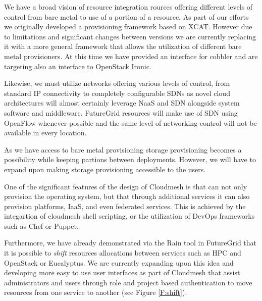 \documentclass{tex/sig-alternate-2013}
\begin{document}
\begin{description}[leftmargin=0pt,itemsep=0pt,topsep=0pt]

\item[Compute Provisioning.] We have a broad vision of resource
  integration rources offering different levels of control from bare
  metal to use of a portion of a resource. As part of our efforts we
  originally developed a provisioning framework based on XCAT. However
  due to limitations and significant changes between versions we are
  currently replacing it with a more general framework that allows the
  utilization of different bare metal provisioners. At this time we
  have provided an interface for cobbler and are targeting also an
  interface to OpenStack Ironic.

\item[Network Provisioning.] Likewise, we must utilize networks
offering various levels of control, from standard IP connectivity to
completely configurable SDNs as novel cloud architectures will almost
certainly leverage NaaS and SDN alongside system software and
middleware. FutureGrid resources will make use of SDN using OpenFlow
whenever possible and the same level of networking control will not be
available in every location.

\item[Storage Provisioning.] As we have access to bare metal
  provisioning storage provisioning becomes a possibility while
  keeping partions between deployments. However, we will have to
  expand upon making storage provisioning accessible to the users.

\item[Platform, IaaS, and Federated Provisioning.] One of the
  significant features of the design of Cloudmesh is that can not only
  provision the operating system, but that through additional services
  it can also provision platforms, IaaS, and even federated
  services. This is achieved by the integartion of cloudmesh shell
  scripting, or the utilization of DevOps frameworks such as Chef or Puppet. 

  Furthermore, we have already demonstrated via the Rain tool in
  FutureGrid that it is possible to {\em shift} resources
  allocations between services such as HPC and OpenStack or
  Eucalyptus. We are currently expanding upon this idea and developing
  more easy to use user interfaces as part of Cloudmesh that assist
  administrators and users through role and project based
  authentication to move resources from one service to another (see
  Figure \ref{F:shift}).

\end{description}
\end{document}
